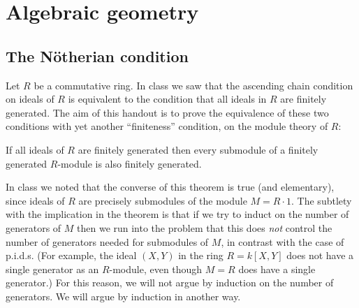 \chapter{Algebraic geometry}
\section{The Nötherian condition}
Let \(R\) be a commutative ring. In class we saw that the ascending chain
condition on ideals of \(R\) is equivalent to the condition that all ideals
in \(R\) are finitely generated. The aim of this handout is to prove the
equivalence of these two conditions with yet another ``finiteness''
condition, on the module theory of \(R\):
\begin{theorem}
  If all ideals of \(R\) are finitely generated then every submodule of a
  finitely generated \(R\)-module is also finitely generated.
\end{theorem}

In class we noted that the converse of this theorem is true (and
elementary), since ideals of \(R\) are precisely submodules of the module
\(M=R\cdot 1\). The subtlety with the implication in the theorem is that if
we try to induct on the number of generators of \(M\) then we run into the
problem that this does \emph{not} control the number of generators needed
for submodules of \(M\), in contrast with the case of p.i.d.s. (For
example, the ideal \((X,Y)\) in the ring \(R=k[X,Y]\) does not have a
single generator as an \(R\)-module, even though \(M=R\) does have a single
generator.) For this reason, we will not argue by induction on the number
of generators. We will argue by induction in another way.


